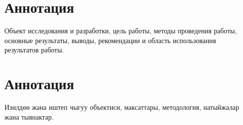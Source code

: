 \section*{Аннотация}
Объект исследования и разработки, цель работы, методы проведения работы, основные результаты, выводы, рекомендации и область использования результатов работы.

\section*{Аннотация}
Изилдөө жана иштеп чыгуу объектиси, максаттары, методология, натыйжалар жана тыянактар.